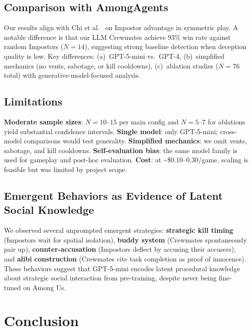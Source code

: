 \documentclass{article}
\begin{document}
\subsection{Comparison with AmongAgents}

Our results align with Chi et al.~\cite{chi2024amongagents} on Impostor advantage in symmetric play. A notable difference is that our LLM Crewmates achieve 93\% win rate against random Impostors ($N=14$), suggesting strong baseline detection when deception quality is low. Key differences: (a)~GPT-5-mini vs.\ GPT-4, (b)~simplified mechanics (no vents, sabotage, or kill cooldowns), (c)~ablation studies ($N=76$ total) with generative-model-focused analysis.

\subsection{Limitations}

\textbf{Moderate sample sizes}: $N=10$--$15$ per main config and $N=5$--$7$ for ablations yield substantial confidence intervals. \textbf{Single model}: only GPT-5-mini; cross-model comparisons would test generality. \textbf{Simplified mechanics}: we omit vents, sabotage, and kill cooldowns. \textbf{Self-evaluation bias}: the same model family is used for gameplay and post-hoc evaluation. \textbf{Cost}: at \textasciitilde\$0.10--0.30/game, scaling is feasible but was limited by project scope.

\subsection{Emergent Behaviors as Evidence of Latent Social Knowledge}

We observed several unprompted emergent strategies: \textbf{strategic kill timing} (Impostors wait for spatial isolation), \textbf{buddy system} (Crewmates spontaneously pair up), \textbf{counter-accusation} (Impostors deflect by accusing their accusers), and \textbf{alibi construction} (Crewmates cite task completion as proof of innocence). These behaviors suggest that GPT-5-mini encodes latent procedural knowledge about strategic social interaction from pre-training, despite never being fine-tuned on Among Us.

\section{Conclusion}
\end{document}
